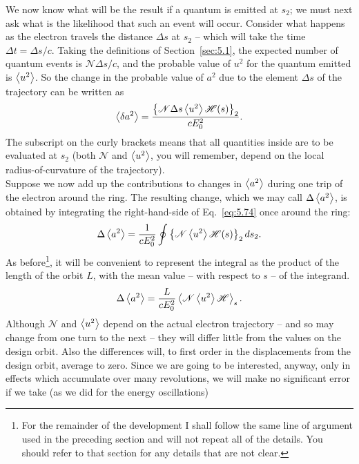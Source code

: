 We now know what will be the result if a quantum is emitted at $s_2$; we must next ask what is the likelihood that such an event will occur. Consider what happens as the electron travels the distance $\Delta s$ at $s_2$ -- which will take the time $\Delta t = \Delta s/c$. Taking the definitions of Section~\ref{sec:5.1}, the expected number of quantum events is $\mathscr{N}\Delta s/c$, and the probable value of $u^2$ for the quantum emitted is $\left< u^2 \right>$. So the change in the probable value of $a^2$ due to the element $\Delta s$ of the trajectory
 can be written as
\begin{align} \label{eq:5.74}
	\left< \delta a^2 \right> = \dfrac{\left\lbrace \mathscr{N} \Delta s \left< u^2 \right> \mathscr{H}(s) \right\rbrace_2}{c E_0^2}.
\end{align}
The subscript on the curly brackets means that all quantities inside are to be evaluated at $s_2$ (both $\mathscr{N}$ and $\left< u^2 \right>$, you will remember, depend on the local radius-of-curvature of the trajectory).\\
Suppose we now add up the contributions to changes in $\left< a^2 \right>$ during one trip of the electron around the ring. The resulting change, which we may call $\Delta \left< a^2 \right>$, is obtained by integrating the right-hand-side of Eq.~\eqref{eq:5.74} once around the ring:
\begin{align}
	\Delta \left< a^2 \right> = \dfrac{1}{c E_0^2} \oint \left\lbrace \mathscr{N} \left< u^2 \right> \mathscr{H}(s) \right\rbrace_2 ds_2.
\end{align}
As before\footnote{For the remainder of the development I shall follow the same line of argument used in the preceding section and will not repeat all of the details. You should refer to
that section for any details that are not clear.}, it will be convenient to represent the integral as the product of the length of the orbit $L$, with the mean value -- with respect to $s$ -- of the integrand.
\begin{align}\label{eq:5.76}
	\Delta \left< a^2 \right> = \dfrac{L}{c E_0^2} \left< \mathscr{N}\left< u^2 \right>\mathscr{H} \right>_s.
\end{align}
Although $\mathscr{N}$ and $\left< u^2 \right>$ depend on the actual electron trajectory -- and so may change from one turn to the next -- they will differ little from the values on the design orbit.
 Also the differences will, to first order in the displacements from the design orbit, average to zero. Since we are going to be interested, anyway, only in effects which accumulate over many revolutions, we will make no significant error if we take (as we did for the energy oscillations)
